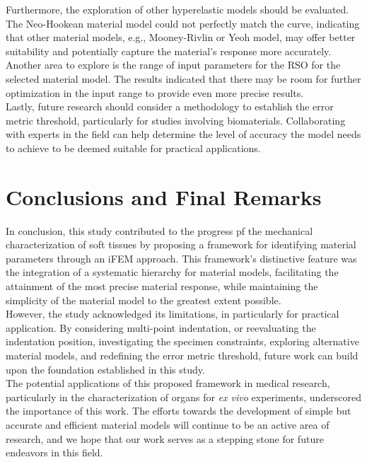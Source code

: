 Furthermore, the exploration of other hyperelastic models should be evaluated. The Neo-Hookean material 
model could not perfectly match the curve, indicating that other material models, e.g., Mooney-Rivlin or Yeoh model, may 
offer better suitability and potentially capture the material's response more accurately. Another area to explore is the range
 of input parameters for the RSO for the selected material model. The results indicated that there may be room 
for further optimization in the input range to provide even more precise results.\\

Lastly, future research should consider a methodology to establish the error metric threshold, particularly for studies
involving biomaterials. Collaborating with experts in the field can help determine the level of accuracy the model 
needs to achieve to be deemed suitable for practical applications.

\section{Conclusions and Final Remarks}

In conclusion, this study contributed to the progress pf the mechanical characterization of soft tissues
by proposing a framework for identifying material parameters through an iFEM approach. This framework's
distinctive feature was the integration of a systematic hierarchy for material models, facilitating the 
attainment of the most precise material response, while maintaining the simplicity of the material model to the 
greatest extent possible.\\

However, the study acknowledged its limitations, in particularly for practical application. By considering
multi-point indentation, or reevaluating the indentation position, investigating the specimen constraints, 
exploring alternative material models, and redefining the error metric threshold, future work can build upon the 
foundation established in this study.\\

The potential applications of this proposed framework in medical research, particularly in the characterization 
of organs for \textit{ex vivo} experiments, underscored the importance of this work. The efforts towards 
the development of simple but accurate and efficient material models will continue to be an active area
of research, and we hope that our work serves as a stepping stone for future endeavors in this field. 
